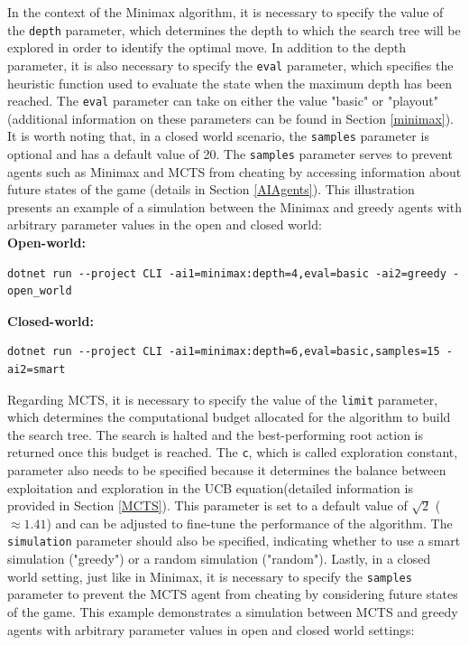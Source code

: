 In the context of the Minimax algorithm, it is necessary to specify the value of the \texttt{depth} parameter, which determines the depth to which the search tree will be explored in order to identify the optimal move. In addition to the depth parameter, it is also necessary to specify the \texttt{eval} parameter, which specifies the heuristic function used to evaluate the state when the maximum depth has been reached. The \texttt{eval} parameter can take on either the value "basic" or "playout" (additional information on these parameters can be found in Section \ref{minimax}). It is worth noting that, in a closed world scenario, the \texttt{samples} parameter is optional and has a default value of 20. The \texttt{samples} parameter serves to prevent agents such as Minimax and MCTS from cheating by accessing information about future states of the game (details in Section \ref{AIAgents}). This illustration presents an example of a simulation between the Minimax and greedy agents with arbitrary parameter values in the open and closed world:\\

\textbf{Open-world: }
\begin{lstlisting}[frame=single]
dotnet run --project CLI -ai1=minimax:depth=4,eval=basic -ai2=greedy -open_world
\end{lstlisting}

\textbf{Closed-world: }
\begin{lstlisting}[frame=single]
dotnet run --project CLI -ai1=minimax:depth=6,eval=basic,samples=15 -ai2=smart
\end{lstlisting}

Regarding MCTS, it is necessary to specify the value of the \texttt{limit} parameter, which determines the computational budget allocated for the algorithm to build the search tree. The search is halted and the best-performing root action is returned once this budget is reached. The \texttt{c}, which is called exploration constant, parameter also needs to be specified because it determines the balance between exploitation and exploration in the UCB equation(detailed information is provided in Section \ref{MCTS}). This parameter is set to a default value of  $\sqrt{2}$ ($\approx 1.41$) and can be adjusted to fine-tune the performance of the algorithm. The \texttt{simulation} parameter should also be specified, indicating whether to use a smart simulation ("greedy") or a random simulation ("random"). Lastly, in a closed world setting, just like in Minimax, it is necessary to specify the \texttt{samples} parameter to prevent the MCTS agent from cheating by considering future states of the game. This example demonstrates a simulation between MCTS and greedy agents with arbitrary parameter values in open and closed world settings: \\

